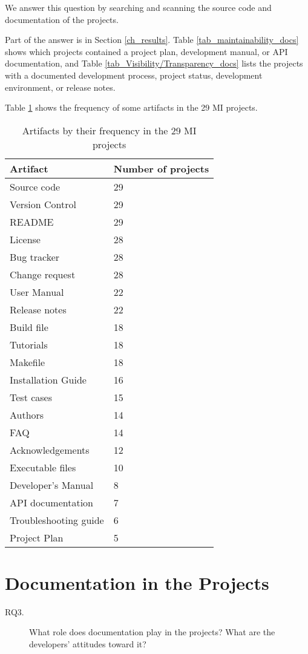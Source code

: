 We answer this question by searching and scanning the source code and documentation of the projects.

Part of the answer is in Section \ref{ch_results}. Table \ref{tab_maintainability_docs} shows which projects contained a project plan, development manual, or API documentation, and Table \ref{tab_Visibility/Transparency_docs} lists the projects with a documented development process, project status, development environment, or release notes.

Table \ref{tab_artifacts_frequency} shows the frequency of some artifacts in the 29 MI projects.

\begin{table}[H]
\centering
\begin{tabular}{ll}
\hline
Artifact & Number of projects \\ \hline
Source code & 29 \\
Version Control & 29 \\
README & 29 \\
License & 28 \\
Bug tracker & 28 \\
Change request & 28 \\
User Manual & 22 \\
Release notes & 22 \\
Build file & 18 \\
Tutorials & 18 \\
Makefile & 18 \\
Installation Guide & 16 \\
Test cases & 15 \\
Authors & 14 \\
FAQ & 14 \\
Acknowledgements & 12 \\
Executable files & 10 \\
Developer's Manual & 8 \\
API documentation & 7 \\
Troubleshooting guide & 6 \\
Project Plan & 5 \\ \hline
\end{tabular}
\caption{\label{tab_artifacts_frequency}Artifacts by their frequency in the 29 MI projects}
\end{table}

\section{Documentation in the Projects}
\label{sec_rq3_documentation}
\begin{description}\item[RQ3.] What role does documentation play in the projects? What are the developers' attitudes toward it?\end{description}

